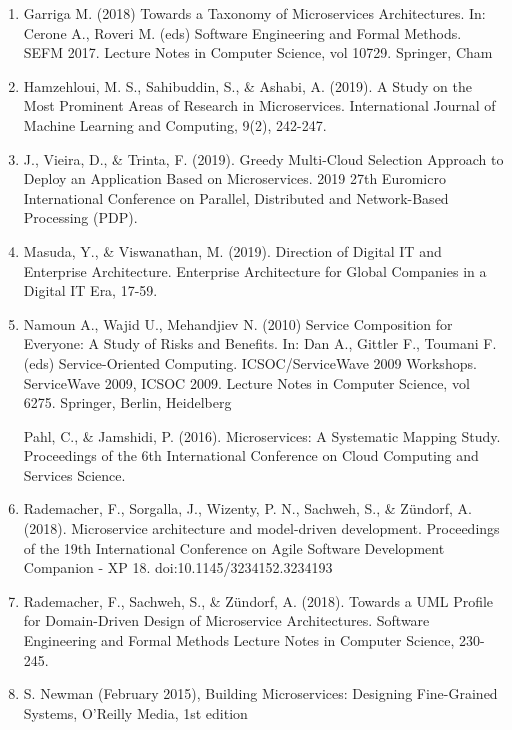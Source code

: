 \documentclass{article}
\begin{document}
\begin{enumerate}
\item Garriga M. (2018) Towards a Taxonomy of Microservices Architectures. In: Cerone A., Roveri M. (eds) Software Engineering and Formal Methods. SEFM 2017. Lecture Notes in Computer Science, vol 10729. Springer, Cham


\item Hamzehloui, M. S., Sahibuddin, S., \& Ashabi, A. (2019). A Study on the Most Prominent Areas of Research in Microservices. International Journal of Machine Learning and Computing, 9(2), 242-247. 


\item J., Vieira, D., \& Trinta, F. (2019). Greedy Multi-Cloud Selection Approach to Deploy an Application Based on Microservices. 2019 27th Euromicro International Conference on Parallel, Distributed and Network-Based Processing (PDP). 


\item Masuda, Y., \& Viswanathan, M. (2019). Direction of Digital IT and Enterprise Architecture. Enterprise Architecture for Global Companies in a Digital IT Era, 17-59. 


\item Namoun A., Wajid U., Mehandjiev N. (2010) Service Composition for Everyone: A Study of Risks and Benefits. In: Dan A., Gittler F., Toumani F. (eds) Service-Oriented Computing. ICSOC/ServiceWave 2009 Workshops. ServiceWave 2009, ICSOC 2009. Lecture Notes in Computer Science, vol 6275. Springer, Berlin, Heidelberg


Pahl, C., \& Jamshidi, P. (2016). Microservices: A Systematic Mapping Study. Proceedings of the 6th International Conference on Cloud Computing and Services Science. 


\item Rademacher, F., Sorgalla, J., Wizenty, P. N., Sachweh, S., \& Zündorf, A. (2018). Microservice architecture and model-driven development. Proceedings of the 19th International Conference on Agile Software Development Companion - XP 18. doi:10.1145/3234152.3234193


\item Rademacher, F., Sachweh, S., \& Zündorf, A. (2018). Towards a UML Profile for Domain-Driven Design of Microservice Architectures. Software Engineering and Formal Methods Lecture Notes in Computer Science, 230-245. 


\item S. Newman (February 2015), Building Microservices: Designing Fine-Grained Systems, O'Reilly Media, 1st edition



\end{enumerate}
\end{document}
